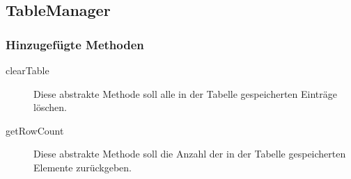 \subsection{TableManager}

\subsubsection{Hinzugefügte Methoden}
\begin{description}
\item[clearTable]
Diese abstrakte Methode soll alle in der Tabelle gespeicherten Einträge löschen.
\item[getRowCount]
Diese abstrakte Methode soll die Anzahl der in der Tabelle gespeicherten Elemente zurückgeben.
\end{description}





